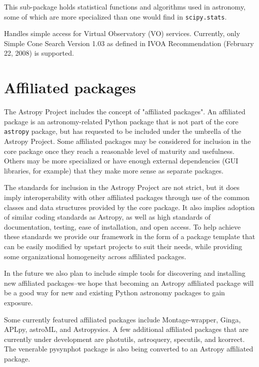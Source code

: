 \documentclass[11pt,twoside]{article}
\begin{document}
This sub-package holds statistical functions and algorithms used in astronomy,
some of which are more specialized than one would find in
\texttt{scipy.stats}.


Handles simple access for Virtual Observatory (VO) services.  Currently, only
Simple Cone Search Version 1.03 as defined in IVOA Recommendation (February 22,
2008) is supported.

\section{Affiliated packages}

The Astropy Project includes the concept of "affiliated packages".  An
affiliated package is an astronomy-related Python package that is not part of
the core \texttt{astropy} package, but has requested to be included under the
umbrella of the Astropy Project.  Some affiliated packages may be considered
for inclusion in the core package once they reach a reasonable level of
maturity and usefulness.  Others may be more specialized or have enough
external dependencies (GUI libraries, for example) that they make more sense
as separate packages.

The standards for inclusion in the Astropy Project are not strict, but it does
imply interoperability with other affiliated packages through use of the
common classes and data structures provided by the core package.  It also
implies adoption of similar coding standards as Astropy, as well as high
standards of documentation, testing, ease of installation, and open access.
To help achieve these standards we provide our framework in the form of a
package template that can be easily modified by upstart projects to suit
their needs, while providing some organizational homogeneity across affiliated
packages.

In the future we also plan to include simple tools for discovering and
installing new affiliated packages--we hope that becoming an Astropy
affiliated package will be a good way for new and existing Python astronomy
packages to gain exposure.

Some currently featured affiliated packages include Montage-wrapper, Ginga,
APLpy, astroML, and Astropysics.  A few additional affiliated packages that
are currently under development are photutils, astroquery, specutils, and
kcorrect.  The venerable pysynphot package is also being converted to an
Astropy affiliated package.
\end{document}
